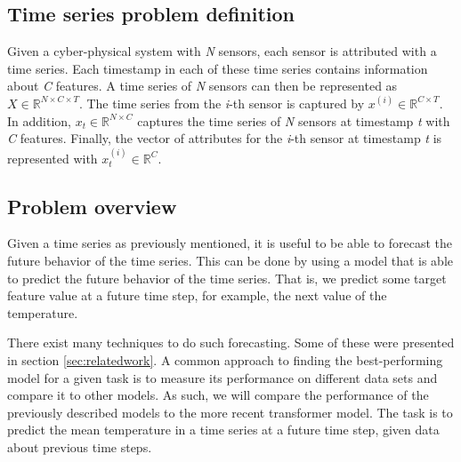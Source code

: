 \subsection{Time series problem definition}
Given a cyber-physical system with \textit{N} sensors, each sensor is attributed with a time series.
Each timestamp in each of these time series contains information about \textit{C} features.
A time series of \textit{N} sensors can then be represented as \(X \in \mathbb{R}^{N \times C \times T}\).
The time series from the \textit{i}-th sensor is captured by \(x^{(i)} \in \mathbb{R}^{C \times T} \).
In addition, \(x_{t} \in \mathbb{R}^{N \times C}\) captures the time series of \textit{N} sensors at timestamp \textit{t} with \textit{C} features.
Finally, the vector of attributes for the \textit{i}-th sensor at timestamp \textit{t} is represented with \(x_{t}^{(i)} \in \mathbb{R}^{C}\). \cite{cirsteaEnhanceNetPluginNeural2021}


\subsection{Problem overview}
Given a time series as previously mentioned, it is useful to be able to forecast the future behavior of the time series.
This can be done by using a model that is able to predict the future behavior of the time series.
That is, we predict some target feature value at a future time step, for example, the next value of the temperature.


There exist many techniques to do such forecasting. Some of these were presented in section \ref{sec:relatedwork}.
A common approach to finding the best-performing model for a given task is to measure its performance on different data sets and compare it to other models.
As such, we will compare the performance of the previously described models to the more recent transformer model.
The task is to predict the mean temperature in a time series at a future time step, given data about previous time steps.